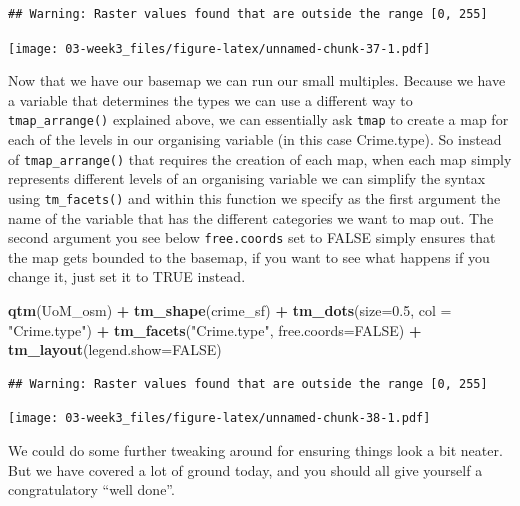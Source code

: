\documentclass[]{book}
\newenvironment{Shaded}{\begin{snugshade}}{\end{snugshade}}
\newcommand{\DataTypeTok}[1]{\textcolor[rgb]{0.13,0.29,0.53}{#1}}
\newcommand{\FloatTok}[1]{\textcolor[rgb]{0.00,0.00,0.81}{#1}}
\newcommand{\KeywordTok}[1]{\textcolor[rgb]{0.13,0.29,0.53}{\textbf{#1}}}
\newcommand{\NormalTok}[1]{#1}
\newcommand{\OperatorTok}[1]{\textcolor[rgb]{0.81,0.36,0.00}{\textbf{#1}}}
\newcommand{\OtherTok}[1]{\textcolor[rgb]{0.56,0.35,0.01}{#1}}
\newcommand{\StringTok}[1]{\textcolor[rgb]{0.31,0.60,0.02}{#1}}
\begin{document}
\begin{verbatim}
## Warning: Raster values found that are outside the range [0, 255]
\end{verbatim}

\texttt{[image: 03-week3\_files/figure-latex/unnamed-chunk-37-1.pdf]}

Now that we have our basemap we can run our small multiples. Because we have a variable that determines the types we can use a different way to \texttt{tmap\_arrange()} explained above, we can essentially ask \texttt{tmap} to create a map for each of the levels in our organising variable (in this case Crime.type). So instead of \texttt{tmap\_arrange()} that requires the creation of each map, when each map simply represents different levels of an organising variable we can simplify the syntax using \texttt{tm\_facets()} and within this function we specify as the first argument the name of the variable that has the different categories we want to map out. The second argument you see below \texttt{free.coords} set to FALSE simply ensures that the map gets bounded to the basemap, if you want to see what happens if you change it, just set it to TRUE instead.

\begin{Shaded}
\begin{Highlighting}[]
\KeywordTok{qtm}\NormalTok{(UoM_osm) }\OperatorTok{+}\StringTok{ }
\StringTok{  }\KeywordTok{tm_shape}\NormalTok{(crime_sf) }\OperatorTok{+}\StringTok{ }
\StringTok{  }\KeywordTok{tm_dots}\NormalTok{(}\DataTypeTok{size=}\FloatTok{0.5}\NormalTok{, }\DataTypeTok{col =} \StringTok{"Crime.type"}\NormalTok{) }\OperatorTok{+}\StringTok{ }
\StringTok{  }\KeywordTok{tm_facets}\NormalTok{(}\StringTok{"Crime.type"}\NormalTok{, }\DataTypeTok{free.coords=}\OtherTok{FALSE}\NormalTok{) }\OperatorTok{+}
\StringTok{  }\KeywordTok{tm_layout}\NormalTok{(}\DataTypeTok{legend.show=}\OtherTok{FALSE}\NormalTok{)}
\end{Highlighting}
\end{Shaded}

\begin{verbatim}
## Warning: Raster values found that are outside the range [0, 255]
\end{verbatim}

\texttt{[image: 03-week3\_files/figure-latex/unnamed-chunk-38-1.pdf]}

We could do some further tweaking around for ensuring things look a bit neater. But we have covered a lot of ground today, and you should all give yourself a congratulatory ``well done''.
\end{document}

